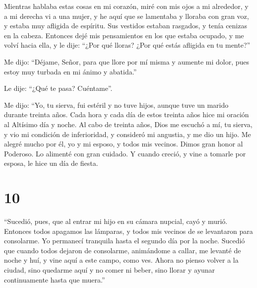  Mientras hablaba estas cosas en mi corazón, miré con mis
ojos a mi alrededor, y a mi derecha vi a una mujer, y he aquí que se
lamentaba y lloraba con gran voz, y estaba muy afligida de espíritu. Sus
vestidos estaban rasgados, y tenía cenizas en la cabeza. 
Entonces dejé mis pensamientos en los que estaba ocupado, y me volví
hacia ella,  y le dije: ``¿Por qué lloras? ¿Por qué estás
afligida en tu mente?''

 Me dijo: ``Déjame, Señor, para que llore por mí misma y
aumente mi dolor, pues estoy muy turbada en mi ánimo y abatida.''

 Le dije: ``¿Qué te pasa? Cuéntame''.

 Me dijo: ``Yo, tu sierva, fui estéril y no tuve hijos,
aunque tuve un marido durante treinta años.  Cada hora y
cada día de estos treinta años hice mi oración al Altísimo día y noche.
 Al cabo de treinta años, Dios me escuchó a mí, tu
sierva, y vio mi condición de inferioridad, y consideró mi angustia, y
me dio un hijo. Me alegré mucho por él, yo y mi esposo, y todos mis
vecinos. Dimos gran honor al Poderoso.  Lo alimenté con
gran cuidado.  Y cuando creció, y vine a tomarle por
esposa, le hice un día de fiesta.

\hypertarget{section-9}{%
\section{10}\label{section-9}}

 ``Sucedió, pues, que al entrar mi hijo en su cámara
nupcial, cayó y murió.  Entonces todos apagamos las
lámparas, y todos mis vecinos de se levantaron para consolarme. Yo
permanecí tranquila hasta el segundo día por la noche. 
Sucedió que cuando todos dejaron de consolarme, animándome a callar, me
levanté de noche y huí, y vine aquí a este campo, como ves.
 Ahora no pienso volver a la ciudad, sino quedarme aquí y
no comer ni beber, sino llorar y ayunar continuamente hasta que muera.''

